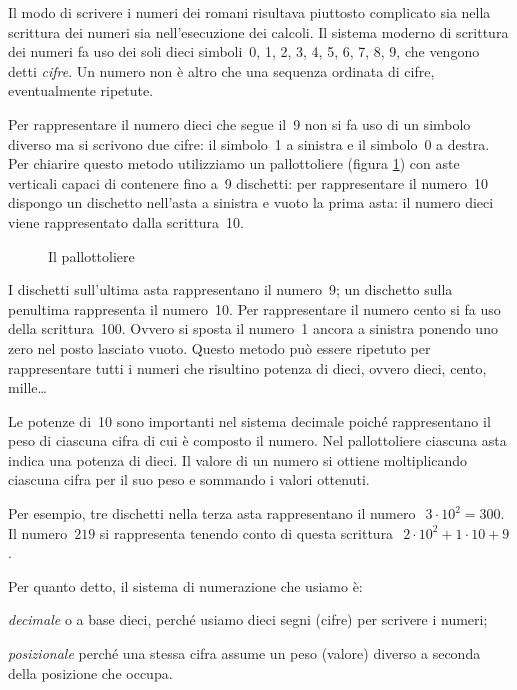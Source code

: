 Il modo di scrivere i numeri dei romani risultava piuttosto complicato sia 
nella scrittura dei numeri sia nell'esecuzione dei calcoli. 
Il sistema moderno di scrittura dei numeri fa uso dei soli dieci 
simboli~0, 1, 2, 3, 4, 5, 6, 7, 8, 9, che vengono detti \emph{cifre}.
Un numero non è altro che una sequenza ordinata di cifre, eventualmente 
ripetute.

Per rappresentare il numero dieci che segue il~9 non si fa uso di un 
simbolo diverso ma si scrivono due cifre: il simbolo~1 a sinistra e il 
simbolo~0 a destra. 
Per chiarire questo metodo utilizziamo un pallottoliere 
(figura \ref{fig:pallottoliere}) con aste verticali capaci di contenere 
fino a~9 dischetti: per rappresentare il numero~10 dispongo un dischetto 
nell'asta a sinistra e vuoto la prima asta: 
il numero dieci viene rappresentato dalla scrittura~10.

\begin{inaccessibleblock}[Pallottoliere]
\begin{figure}[h]
\begin{center}

\caption{Il pallottoliere}
\label{fig:pallottoliere}
\end{center}
\end{figure}
\end{inaccessibleblock}

 
I dischetti sull'ultima asta rappresentano il numero~9; un dischetto sulla 
penultima rappresenta il numero~10. 
Per rappresentare il numero cento si fa uso della scrittura~100.
Ovvero si sposta il numero~1 ancora a sinistra ponendo uno zero nel posto 
lasciato vuoto.
Questo metodo può essere ripetuto per rappresentare tutti i numeri che 
risultino potenza di dieci, ovvero dieci, cento, mille\ldots

Le potenze di~10 sono importanti nel sistema decimale poiché rappresentano 
il peso di ciascuna cifra di cui è composto il numero. 
Nel pallottoliere ciascuna asta indica una potenza di dieci. 
Il valore di un numero si ottiene moltiplicando ciascuna cifra per il
suo peso e sommando i valori ottenuti.

Per esempio, tre dischetti nella terza asta rappresentano il 
numero~\(~3\cdot 10^2=300\).
Il numero~\(219\) si rappresenta tenendo conto di questa 
scrittura~\(~2\cdot 10^2+1\cdot 10+9\).

Per quanto detto, il sistema di numerazione che usiamo è:

\begin{itemize*}
 \item \emph{decimale} o a base dieci, 
  perché usiamo dieci segni (cifre) per scrivere i numeri;
 \item \emph{posizionale} 
  perché una stessa cifra assume un peso (valore) diverso a seconda della 
  posizione che occupa.
\end{itemize*}

